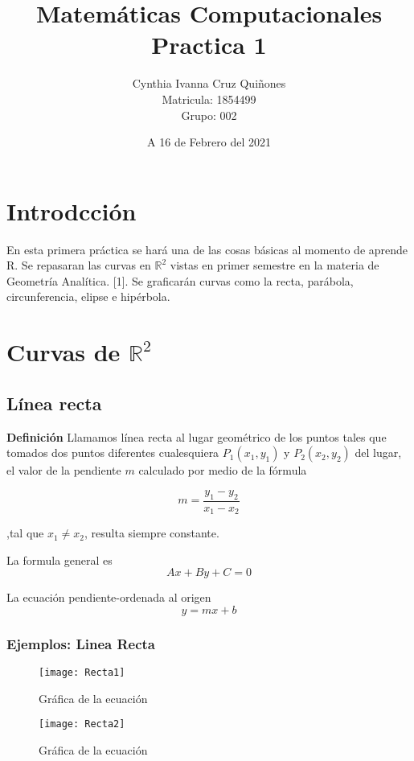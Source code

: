 \documentclass[12pt,a4paper]{article} %
\author{Cynthia Ivanna Cruz Quiñones\\
Matricula: 1854499\\
Grupo: 002}
\title{Matemáticas Computacionales\\
Practica 1}
\date{A 16 de Febrero del 2021}
\begin{document}
\maketitle

\newpage
\tableofcontents

\newpage

\section{Introdcción}
En esta primera práctica se hará una de las cosas básicas al momento de aprende R. Se
repasaran las curvas en $\mathbb{R}^2$ vistas en primer semestre en la materia de Geometría Analítica. [1].
Se graficarán curvas como la recta, parábola, circunferencia, elipse e hipérbola.

\section{Curvas de $\mathbb{R}^2$} \label{sec:curvas}

\subsection{Línea recta} \label{subsec:linearecta}
\textbf{Definición}
Llamamos línea recta al lugar geométrico de los puntos tales que tomados dos puntos diferentes cualesquiera $P_{1}(x_{1}, y_{1})$ y $P_{2}(x_{2}, y_{2})$ del lugar, el valor de la pendiente $m$ calculado por medio de la fórmula 

$$ m = \frac{y_{1} - y_{2}}{x_{1} - x_{2}}$$ 

,tal que  ${x_{1}\neq x_{2}}$, resulta siempre constante. 

La formula general es
$$Ax + By + C = 0$$

La ecuación pendiente-ordenada al origen
$$y = mx + b$$

\subsubsection{Ejemplos: Linea Recta}

\begin{figure}[h]
\centering
\texttt{[image: Recta1]}
\caption{Gráfica de la ecuación }
\label{fig:LineaRecta}
\end{figure}

\begin{figure}[ht]
\centering
\texttt{[image: Recta2]}
\caption{Gráfica de la ecuación }
\label{fig:LineaRecta2}
\end{figure}
\end{document}
